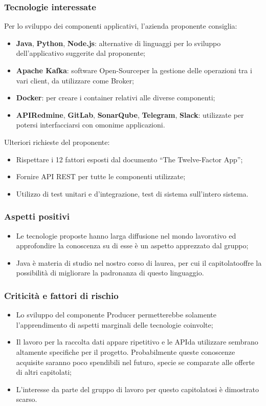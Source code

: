 \subsubsection{Tecnologie interessate}
Per lo sviluppo dei componenti applicativi, l'azienda proponente consiglia:
\begin{itemize}
	\item \textbf{Java}, \textbf{Python}\glo, \textbf{Node.js}\glo: alternative di linguaggi per lo sviluppo dell'applicativo suggerite dal proponente; 
	\item\textbf{Apache Kafka}\glo: software Open-Source\glosp per la gestione delle operazioni tra i vari client, da utilizzare come Broker;
	\item \textbf{Docker}\glo: per creare i container relativi alle diverse componenti;
	\item \textbf{API\glosp Redmine}\glo,  \textbf{GitLab}\glo,  \textbf{SonarQube}\glo,  \textbf{Telegram}\glo, \textbf{Slack}\glo: utilizzate per potersi interfacciarsi con omonime applicazioni.
\end{itemize}
Ulteriori richieste del proponente:
\begin{itemize}
	\item Rispettare i 12 fattori esposti dal documento “The Twelve-Factor App”;
	\item Fornire API REST per tutte le componenti utilizzate; 
	\item Utilizzo di test unitari e d’integrazione, test di sistema sull’intero sistema.
\end{itemize}
\subsubsection{Aspetti positivi}
\begin{itemize}
	\item Le tecnologie proposte hanno larga diffusione nel mondo lavorativo ed
	 approfondire la conoscenza su di esse è un aspetto apprezzato dal gruppo;
	\item Java è materia di studio nel nostro corso di laurea, per cui il
	 capitolato\glosp offre la possibilità di migliorare la padronanza di questo
	 linguaggio.
\end{itemize}
\subsubsection{Criticità e fattori di rischio}
\begin{itemize}
	\item Lo sviluppo del componente Producer permetterebbe solamente l'apprendimento di aspetti marginali delle tecnologie coinvolte;
	\item Il lavoro per la raccolta dati appare ripetitivo 
	 e le API\glosp da utilizzare sembrano altamente specifiche per il progetto. Probabilmente queste conoscenze acquisite saranno poco spendibili nel futuro, specie se comparate alle offerte di altri capitolati;
	\item L'interesse da parte del gruppo di lavoro per questo capitolato\glosp si è dimostrato scarso.
\end{itemize}
